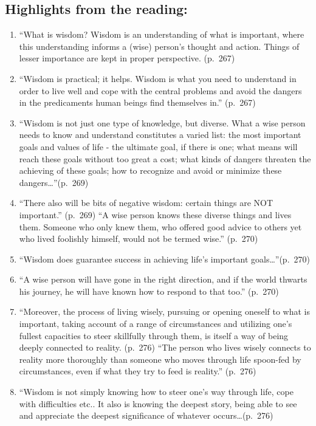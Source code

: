 \documentclass[
]{book}
\providecommand{\tightlist}{%
  \setlength{\itemsep}{0pt}\setlength{\parskip}{0pt}}
\begin{document}
\hypertarget{highlights-from-the-reading}{%
\subsection{Highlights from the reading:}\label{highlights-from-the-reading}}

\begin{enumerate}
\def\labelenumi{\arabic{enumi}.}
\tightlist
\item
  ``What is wisdom? Wisdom is an understanding of what is important, where this understanding informs a (wise) person's thought and action. Things of lesser importance are kept in proper perspective. (p.~267)
\item
  ``Wisdom is practical; it helps. Wisdom is what you need to understand in order to live well and cope with the central problems and avoid the dangers in the predicaments human beings find themselves in.'' (p.~267)
\item
  ``Wisdom is not just one type of knowledge, but diverse. What a wise person needs to know and understand constitutes a varied list: the most important goals and values of life - the ultimate goal, if there is one; what means will reach these goals without too great a cost; what kinds of dangers threaten the achieving of these goals; how to recognize and avoid or minimize these dangers\ldots{}''(p.~269)
\item
  ``There also will be bits of negative wisdom: certain things are NOT important.'' (p.~269)
  ``A wise person knows these diverse things and lives them. Someone who only knew them, who offered good advice to others yet who lived foolishly himself, would not be termed wise.'' (p.~270)
\item
  ``Wisdom does guarantee success in achieving life's important goals\ldots{}''(p.~270)
\item
  ``A wise person will have gone in the right direction, and if the world thwarts his journey, he will have known how to respond to that too.'' (p.~270)
\item
  ``Moreover, the process of living wisely, pursuing or opening oneself to what is important, taking account of a range of circumstances and utilizing one's fullest capacities to steer skillfully through them, is itself a way of being deeply connected to reality. (p.~276)
  ``The person who lives wisely connects to reality more thoroughly than someone who moves through life spoon-fed by circumstances, even if what they try to feed is reality.'' (p.~276)
\item
  ``Wisdom is not simply knowing how to steer one's way through life, cope with difficulties etc.. It also is knowing the deepest story, being able to see and appreciate the deepest significance of whatever occurs\ldots(p.~276)
\end{enumerate}
\end{document}
